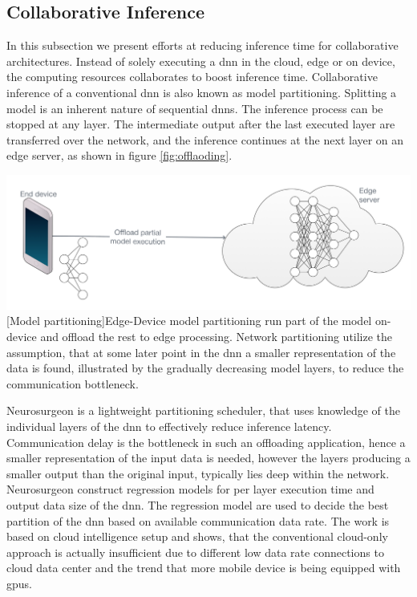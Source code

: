 \subsection{Collaborative Inference}

In this subsection we present efforts at reducing inference time for collaborative architectures. Instead of solely executing a \gls{dnn} in the cloud, edge or on device, the computing resources collaborates to boost inference time. Collaborative inference of a conventional \gls{dnn} is also known as model partitioning. Splitting a model is an inherent nature of sequential \gls{dnn}s. The inference process can be stopped at any layer. The intermediate output after the last executed layer are transferred over the network, and the inference continues at the next layer on an edge server, as shown in figure \ref{fig:offlaoding}.

\begin{minipage}[t]{\linewidth}    
	\centering
	\includegraphics[width=\linewidth]{figures/models/partitioning}
	[Model partitioning]{Edge-Device model partitioning run part of the model on-device and offload the rest to edge processing. Network partitioning utilize the assumption, that at some later point in the \gls{dnn} a smaller representation of the data is found, illustrated by the gradually decreasing model layers, to reduce the communication bottleneck. }
	\label{fig:offlaoding}
\end{minipage}

Neurosurgeon \cite{kang_neurosurgeon:_2017} is a lightweight partitioning scheduler, that uses knowledge of the individual layers of the \gls{dnn} to effectively reduce inference latency. Communication delay is the bottleneck in such an offloading application, hence a smaller representation of the input data is needed, however the layers producing a smaller output than the original input, typically lies deep within the network. Neurosurgeon construct regression models for per layer execution time and output data size of the \gls{dnn}. The regression model are used to decide the best partition of the \gls{dnn} based on available communication data rate. The work is based on cloud intelligence setup and shows, that the conventional cloud-only approach is actually insufficient due to different low data rate connections to cloud data center and the trend that more mobile device is being equipped with \gls{gpu}s. 




